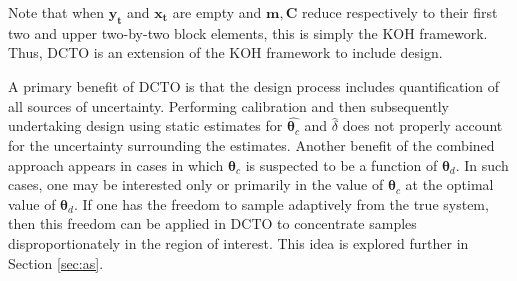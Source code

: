 \documentclass[12pt]{article}
\begin{document}
%
Note that when $\mathbf{y_t}$ and $\mathbf{x_t}$ are empty and $\mathbf m, \mathbf C$ reduce respectively to their first two and upper two-by-two block elements, this is simply the KOH framework.
%
Thus, DCTO is an extension of the KOH framework to include design.
%

%
A primary benefit of DCTO is that the design process includes quantification of all sources of uncertainty.
%
Performing calibration and then subsequently undertaking design using static estimates for $\widehat{\boldsymbol\theta_c}$ and $\widehat \delta$ does not properly account for the uncertainty surrounding the estimates. 
%
Another benefit of the combined approach appears in cases in which $\boldsymbol\theta_c$ is suspected to be a function of $\boldsymbol\theta_d$.
%
In such cases, one may be interested only or primarily in the value of $\boldsymbol\theta_c$ at the optimal value of $\boldsymbol\theta_d$.
%
If one has the freedom to sample adaptively from the true system, then this freedom can be applied in DCTO to concentrate samples disproportionately in the region of interest.
%
This idea is explored further in Section \ref{sec:as}.
%
\end{document}
